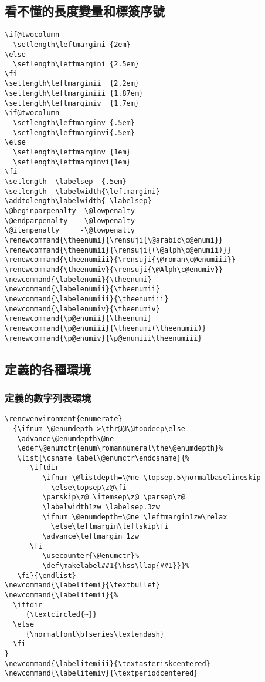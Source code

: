 \subsection{看不懂的長度變量和標簽序號}

\begin{lstlisting}[firstnumber=1030]
\if@twocolumn
  \setlength\leftmargini {2em}
\else
  \setlength\leftmargini {2.5em}
\fi
\setlength\leftmarginii  {2.2em}
\setlength\leftmarginiii {1.87em}
\setlength\leftmarginiv  {1.7em}
\if@twocolumn
  \setlength\leftmarginv {.5em}
  \setlength\leftmarginvi{.5em}
\else
  \setlength\leftmarginv {1em}
  \setlength\leftmarginvi{1em}
\fi
\setlength  \labelsep  {.5em}
\setlength  \labelwidth{\leftmargini}
\addtolength\labelwidth{-\labelsep}
\@beginparpenalty -\@lowpenalty
\@endparpenalty   -\@lowpenalty
\@itempenalty     -\@lowpenalty
\renewcommand{\theenumi}{\rensuji{\@arabic\c@enumi}}
\renewcommand{\theenumii}{\rensuji{(\@alph\c@enumii)}}
\renewcommand{\theenumiii}{\rensuji{\@roman\c@enumiii}}
\renewcommand{\theenumiv}{\rensuji{\@Alph\c@enumiv}}
\newcommand{\labelenumi}{\theenumi}
\newcommand{\labelenumii}{\theenumii}
\newcommand{\labelenumiii}{\theenumiii}
\newcommand{\labelenumiv}{\theenumiv}
\renewcommand{\p@enumii}{\theenumi}
\renewcommand{\p@enumiii}{\theenumi(\theenumii)}
\renewcommand{\p@enumiv}{\p@enumiii\theenumiii}
\end{lstlisting}



\subsection{定義的各種環境}

\subsubsection{定義的數字列表環境}
\begin{lstlisting}[firstnumber=1064]
\renewenvironment{enumerate}
  {\ifnum \@enumdepth >\thr@@\@toodeep\else
   \advance\@enumdepth\@ne
   \edef\@enumctr{enum\romannumeral\the\@enumdepth}%
   \list{\csname label\@enumctr\endcsname}{%
      \iftdir
         \ifnum \@listdepth=\@ne \topsep.5\normalbaselineskip
           \else\topsep\z@\fi
         \parskip\z@ \itemsep\z@ \parsep\z@
         \labelwidth1zw \labelsep.3zw
         \ifnum \@enumdepth=\@ne \leftmargin1zw\relax
           \else\leftmargin\leftskip\fi
         \advance\leftmargin 1zw
      \fi
         \usecounter{\@enumctr}%
         \def\makelabel##1{\hss\llap{##1}}}%
   \fi}{\endlist}
\newcommand{\labelitemi}{\textbullet}
\newcommand{\labelitemii}{%
  \iftdir
     {\textcircled{~}}
  \else
     {\normalfont\bfseries\textendash}
  \fi
}
\newcommand{\labelitemiii}{\textasteriskcentered}
\newcommand{\labelitemiv}{\textperiodcentered}
\end{lstlisting}


